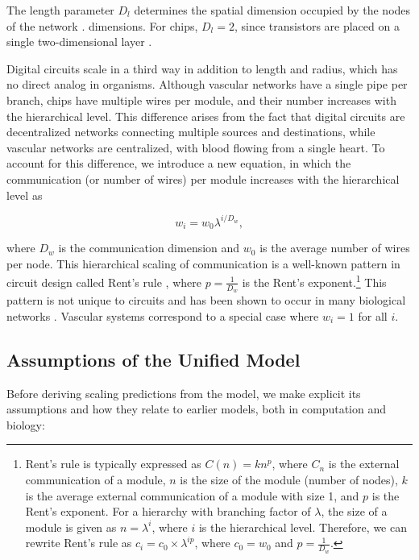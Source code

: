 \documentclass[12pt]{article}
\begin{document}
The length parameter $D_l$ determines the spatial dimension occupied by the
nodes of the network \cite{mandelbrot83}.
dimensions.  For chips, $D_l = 2$, since transistors are placed on a single
two-dimensional layer \cite{donath81}.

Digital circuits scale in a third way in addition to length and radius, which
has no direct analog in organisms. Although vascular networks have a single
pipe per branch, chips have multiple wires per module, and their number
increases with the hierarchical level. This difference arises from the fact
that digital circuits are decentralized networks connecting multiple sources
and destinations, while vascular networks are centralized, with blood flowing
from a single heart. To account for this difference, we introduce a new
equation, in which the communication (or number of wires) per module increases
with the hierarchical level as

\begin{equation}
w_i = w_0 \lambda^{i/D_w},
\label{eq:communication}
\end{equation}

\noindent where $D_w$ is the communication dimension and $w_0$ is the average
number of wires per node.  This hierarchical scaling of communication is a
well-known pattern in circuit design called Rent's rule \cite{christie00},
where $p = \frac{1}{D_w}$ is the Rent's exponent.\footnote{Rent's rule is typically
  expressed as $C(n) = kn^p$, where $C_n$ is the external communication of a
  module, $n$ is the size of the module (number of nodes), $k$ is the average
  external communication of a module with size 1, and $p$ is the Rent’s
  exponent. For a hierarchy with branching factor of $\lambda$, the size of a
  module is given as $n = \lambda^i$, where $i$ is the hierarchical level.
  Therefore, we can rewrite Rent’s rule as $c_i = c_0 \times \lambda^{ip}$,
where $c_0 = w_0$ and $p = \frac{1}{D_w}$.} This pattern is not unique to circuits
and has been shown to occur in many biological networks
\cite{reda09,bassett10}.   Vascular systems correspond to a special case where 
$w_i = 1$ for all $i$. 

\subsection{Assumptions of the Unified Model}
\label{sec:assumptions}

Before deriving scaling predictions from the model, we make explicit
its  assumptions and how they relate to earlier models, both in
computation and biology:
\end{document}
